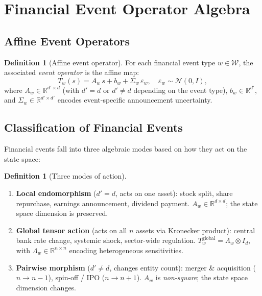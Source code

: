 \documentclass[12pt,a4paper]{article}
\theoremstyle{plain}
\theoremstyle{definition}
\newtheorem{definition}[theorem]{Definition}
\newcommand{\R}{\mathbb{R}}
\newcommand{\1}{\mathbbm{1}}
\begin{document}
\section{Financial Event Operator Algebra}
\label{sec:events}

\subsection{Affine Event Operators}

\begin{definition}[Affine event operator]
\label{def:operator}
For each financial event type $w \in \mathcal{W}$, the associated
\emph{event operator} is the affine map:
\begin{equation}
T_w(s) = A_w\,s + b_w + \Sigma_w\,\varepsilon_w,
\quad \varepsilon_w \sim \mathcal{N}(0, I),
\end{equation}
where $A_w \in \R^{d'\times d}$ (with $d' = d$ or $d'\neq d$ depending on
the event type), $b_w \in \R^{d'}$, and
$\Sigma_w \in \R^{d'\times d'}$ encodes event-specific announcement uncertainty.
\end{definition}

\subsection{Classification of Financial Events}

Financial events fall into three algebraic modes based on how they act on the
state space:

\begin{definition}[Three modes of action]
\label{def:modes}
\begin{enumerate}[label=(\Roman*)]
\item \textbf{Local endomorphism} ($d' = d$, acts on one asset):
  stock split, share repurchase, earnings announcement, dividend payment.
  $A_w \in \R^{d\times d}$; the state space dimension is preserved.
\item \textbf{Global tensor action} (acts on all $n$ assets via Kronecker product):
  central bank rate change, systemic shock, sector-wide regulation.
  $T_w^{\mathrm{global}} = \Lambda_w \otimes I_d$, with
  $\Lambda_w \in \R^{n\times n}$ encoding heterogeneous sensitivities.
\item \textbf{Pairwise morphism} ($d'\neq d$, changes entity count):
  merger \& acquisition ($n\to n-1$), spin-off / IPO ($n\to n+1$).
  $A_w$ is \emph{non-square}; the state space dimension changes.
\end{enumerate}
\end{definition}
\end{document}
